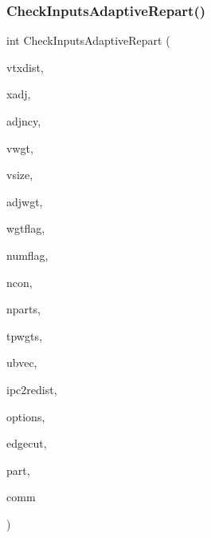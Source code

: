 \subsubsection{\texorpdfstring{Check\+Inputs\+Adaptive\+Repart()}{CheckInputsAdaptiveRepart()}}
{\footnotesize\ttfamily int Check\+Inputs\+Adaptive\+Repart (\begin{DoxyParamCaption}\item[{\hyperlink{a00876_aaa5262be3e700770163401acb0150f52}{idx\+\_\+t} $\ast$}]{vtxdist,  }\item[{\hyperlink{a00876_aaa5262be3e700770163401acb0150f52}{idx\+\_\+t} $\ast$}]{xadj,  }\item[{\hyperlink{a00876_aaa5262be3e700770163401acb0150f52}{idx\+\_\+t} $\ast$}]{adjncy,  }\item[{\hyperlink{a00876_aaa5262be3e700770163401acb0150f52}{idx\+\_\+t} $\ast$}]{vwgt,  }\item[{\hyperlink{a00876_aaa5262be3e700770163401acb0150f52}{idx\+\_\+t} $\ast$}]{vsize,  }\item[{\hyperlink{a00876_aaa5262be3e700770163401acb0150f52}{idx\+\_\+t} $\ast$}]{adjwgt,  }\item[{\hyperlink{a00876_aaa5262be3e700770163401acb0150f52}{idx\+\_\+t} $\ast$}]{wgtflag,  }\item[{\hyperlink{a00876_aaa5262be3e700770163401acb0150f52}{idx\+\_\+t} $\ast$}]{numflag,  }\item[{\hyperlink{a00876_aaa5262be3e700770163401acb0150f52}{idx\+\_\+t} $\ast$}]{ncon,  }\item[{\hyperlink{a00876_aaa5262be3e700770163401acb0150f52}{idx\+\_\+t} $\ast$}]{nparts,  }\item[{\hyperlink{a00876_a1924a4f6907cc3833213aba1f07fcbe9}{real\+\_\+t} $\ast$}]{tpwgts,  }\item[{\hyperlink{a00876_a1924a4f6907cc3833213aba1f07fcbe9}{real\+\_\+t} $\ast$}]{ubvec,  }\item[{\hyperlink{a00876_a1924a4f6907cc3833213aba1f07fcbe9}{real\+\_\+t} $\ast$}]{ipc2redist,  }\item[{\hyperlink{a00876_aaa5262be3e700770163401acb0150f52}{idx\+\_\+t} $\ast$}]{options,  }\item[{\hyperlink{a00876_aaa5262be3e700770163401acb0150f52}{idx\+\_\+t} $\ast$}]{edgecut,  }\item[{\hyperlink{a00876_aaa5262be3e700770163401acb0150f52}{idx\+\_\+t} $\ast$}]{part,  }\item[{M\+P\+I\+\_\+\+Comm $\ast$}]{comm }\end{DoxyParamCaption})}

